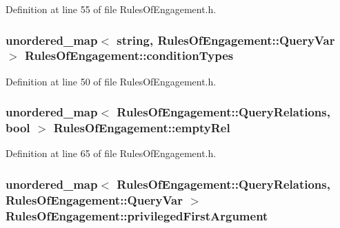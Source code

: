 Definition at line 55 of file Rules\-Of\-Engagement.\-h.

\hypertarget{class_rules_of_engagement_a5f44ebe9fe8019b6415272f410673755}{
\subsubsection[{condition\-Types}]{\setlength{\rightskip}{0pt plus 5cm}unordered\-\_\-map$<$ string, {\bf Rules\-Of\-Engagement\-::\-Query\-Var} $>$ Rules\-Of\-Engagement\-::condition\-Types\hspace{0.3cm}{\ttfamily [static]}}}\label{class_rules_of_engagement_a5f44ebe9fe8019b6415272f410673755}


Definition at line 50 of file Rules\-Of\-Engagement.\-h.

\hypertarget{class_rules_of_engagement_a343933b8d961a5dfab7a3cdd979820cf}{
\subsubsection[{empty\-Rel}]{\setlength{\rightskip}{0pt plus 5cm}unordered\-\_\-map$<$ {\bf Rules\-Of\-Engagement\-::\-Query\-Relations}, bool $>$ Rules\-Of\-Engagement\-::empty\-Rel\hspace{0.3cm}{\ttfamily [static]}}}\label{class_rules_of_engagement_a343933b8d961a5dfab7a3cdd979820cf}


Definition at line 65 of file Rules\-Of\-Engagement.\-h.

\hypertarget{class_rules_of_engagement_a7dd292534cee25afe99b1187a6e07774}{
\subsubsection[{privileged\-First\-Argument}]{\setlength{\rightskip}{0pt plus 5cm}unordered\-\_\-map$<$ {\bf Rules\-Of\-Engagement\-::\-Query\-Relations}, {\bf Rules\-Of\-Engagement\-::\-Query\-Var} $>$ Rules\-Of\-Engagement\-::privileged\-First\-Argument\hspace{0.3cm}{\ttfamily [static]}}}\label{class_rules_of_engagement_a7dd292534cee25afe99b1187a6e07774}


